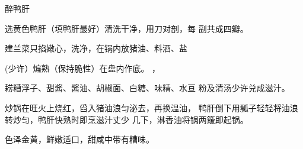 \begin{recipe}{醉鸭肝}

\ingredients


\cooking

\step 	选黄色鸭肝（填鸭肝最好）清洗干净，用刀对剖，每 副共成四瓣。

\step 	建兰菜只掐嫩心，洗净，在锅内放猪油、料酒、盐

(少许）煸熟（保持脆性）在盘内作底。	，

\step 	耢糟浮子、甜酱、酱油、胡椒面、白糖、味精、水亘 粉及清汤少许兑成滋汁。

\step 	炒锅在旺火上烧红，舀入猪油浪匀泌去，再换温油， 鸭肝倒下用瓢子轻轻将油浪转炒匀，鸭肝快熟时即烹滋汁丈少 几下，淋香油将锅两簸即起锅。

\notes

色泽金黄，鲜嫩适口，甜咸中带有糟味。

\end{recipe}

